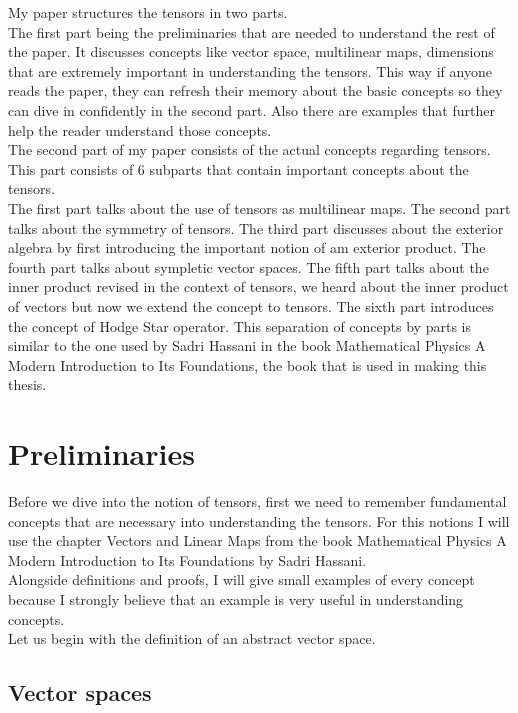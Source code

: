 \documentclass[12pt,a4paper]{article}
\begin{document}
My paper structures the tensors in two parts.\\The first part being the preliminaries that are needed to understand the rest of the paper. It discusses concepts like vector space, multilinear maps, dimensions that are extremely important in understanding the tensors. This way if anyone reads the paper, they can refresh their memory about the basic concepts so they can dive in confidently in the second part. Also there are examples that further help the reader understand those concepts.\\
The second part of my paper consists of the actual concepts regarding tensors. This part consists of 6 subparts that contain important concepts about the tensors.\\The first part talks about the use of tensors as multilinear maps. The second part talks about the symmetry of tensors. The third part discusses about the exterior algebra by first introducing the important notion of am exterior product. The fourth part talks about sympletic vector spaces. The fifth part talks about the inner product revised in the context of tensors, we heard about the inner product of vectors but now we extend the concept to tensors. The sixth part introduces the concept of Hodge Star operator. This separation of concepts by parts is similar to the one used by Sadri Hassani in the book Mathematical Physics A Modern Introduction to Its Foundations, the book that is used in making this thesis. 
\newpage 
\section{Preliminaries}
Before we dive into the notion of tensors, first we need to remember fundamental concepts that are necessary into understanding the tensors. For this notions I will use the chapter Vectors and Linear Maps from the book Mathematical Physics A Modern Introduction to Its Foundations by Sadri Hassani. \\Alongside definitions and proofs, I will give small examples of every concept because I strongly believe that an example is very useful in understanding concepts.\\
Let us begin with the definition of an abstract vector space.

\subsection{Vector spaces}
\end{document}
